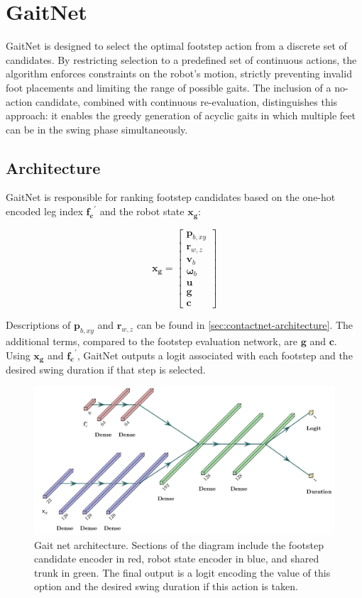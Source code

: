 \section{GaitNet}

GaitNet is designed to select the optimal footstep action from a
discrete set of candidates. By restricting selection to a predefined
set of continuous actions, the algorithm enforces constraints on the
robot’s motion, strictly preventing invalid foot placements and
limiting the range of possible gaits. The inclusion of a no-action
candidate, combined with continuous re-evaluation, distinguishes this
approach: it enables the greedy generation of acyclic gaits in which
multiple feet can be in the swing phase simultaneously.

\subsection{Architecture}

GaitNet is responsible for ranking footstep candidates based on the
one-hot encoded leg index $\mathbf{f_c}^{\prime}$ and the robot state
$\mathbf{x_g}$:

\[
  \mathbf{x_g} =
  \begin{bmatrix}
    \mathbf p_{b,xy} \\
    \mathbf r_{w,z} \\
    \mathbf v_b \\
    \mathbf \omega_b \\
    \mathbf u \\
    \mathbf g \\
    \mathbf c
  \end{bmatrix}
\]

Descriptions of $\mathbf p_{b,xy}$ and $\mathbf r_{w,z}$ can be found
in \autoref{sec:contactnet-architecture}. The additional terms,
compared to the footstep evaluation network, are $\mathbf g$ and
$\mathbf c$. Using $\mathbf{x_g}$ and $\mathbf{f_c}^{\prime}$,
GaitNet outputs a logit associated with each footstep and the desired
swing duration if that step is selected.

\begin{figure}[H]
  \centering
  \includegraphics[width=0.625\linewidth]{images/diagrams/gait-network-architecture.png}
  \caption{Gait net architecture. Sections of the diagram include the
    footstep candidate encoder in red,
    robot state encoder in blue, and shared trunk in green.
    The final output is a logit encoding the value of this option and the
  desired swing duration if this action is taken.}
  \label{fig:diagram-gaitnet-architecture}
\end{figure}

